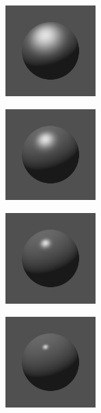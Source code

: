 \begin{Figure}
    \begin{FigureSub}[$p=10$]
        \includegraphics[width=3.5cm]{image/RasterizationIOW/SphereP1.png}
    \end{FigureSub}
    \begin{FigureSub}[$p=30$]
        \includegraphics[width=3.5cm]{image/RasterizationIOW/SphereP2.png}
    \end{FigureSub}
    \begin{FigureSub}[$p=100$]
        \includegraphics[width=3.5cm]{image/RasterizationIOW/SphereP3.png}
    \end{FigureSub}
    \begin{FigureSub}[$p=300$]
        \includegraphics[width=3.5cm]{image/RasterizationIOW/SphereP4.png}
    \end{FigureSub}
\end{Figure}